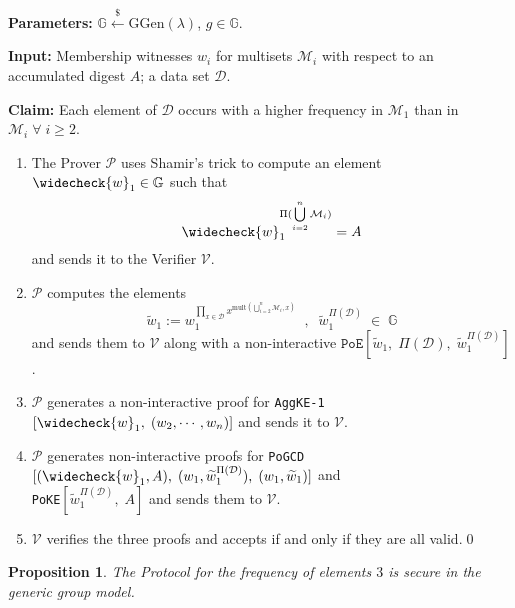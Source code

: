 \documentclass[11pt, lettersize, notitlepage, leqno, footskip=0.6cm]{article}
\newcommand{\pl}{\prod\limits}
\newcommand{\ttt}{\texttt}
\newcommand{\wti}{\widetilde}
\newcommand{\mc}{\mathcal}
\newcommand{\mb}{\mathbb}
\newcommand{\mr}{\mathrm}
\newcommand{\lamb}{\lambda}
\newcommand{\weck}{\widecheck}
\newcommand{\mP}{\mc{P}}
\newcommand{\V}{\mc{V}}
\newcommand{\vs}{\vspace{-0.15cm}}
\newcommand{\noin}{\noindent}
\newtheorem{Prop}[Thm]{Proposition}
\numberwithin{equation}{section}
\begin{document}
\noin \textbf{Parameters:} $\mb{G}\xleftarrow{\$} \mr{GGen}(\lamb)$,\; $g\in \mb{G}$.

\noin \textbf{Input:} Membership witnesses $w_i$ for multisets $\mc{M}_i$ with respect to an accumulated digest $A$; a data set $\mc{D}$.

\noin \textbf{Claim:} Each element of $\mc{D}$ occurs with a higher frequency in $\mc{M}_1$ than in $\mc{M}_i\;\forall\;i\geq 2$. \vs

\begin{enumerate}[wide, labelwidth=!, labelindent=0pt] \vs

\item The Prover $\mP$ uses Shamir's trick to compute an element $\weck{w}_1\in \mb{G}$ such that \vs $$\weck{w}_1 ^{\Pi(\bigcup\limits_{i=2}^n \mc{M}_i)} = A $$ and sends it to the Verifier $\V$. \vs

\item $\mP$ computes the elements \vs $$\wti{w}_1:= w_1^{\pl_{x\in\mc{D}} x^{\mr{mult}(\bigcup\limits_{i=2}^n \mc{M}_i, x)}}\;\;,\;\; \wti{w}_1^{\Pi(\mc{D})}\;\in\;\mb{G}$$ and sends them to $\V$ along with a non-interactive $\ttt{PoE}[\wti{w}_1,\;\Pi(\mc{D}),\;\wti{w}_1^{\Pi(\mc{D})}]$. \vs

\item $\mP$ generates a non-interactive proof for \verb|AggKE-1|$[\weck{w}_1,\;(w_2,\cdots,w_n)]$ and sends it to $\V$. \vs

\item $\mP$ generates non-interactive proofs for \verb|PoGCD|$[(\weck{w}_1, A),\;(w_1,\wti{w}_1^{\Pi(\mc{D})}),\;(w_1,\wti{w}_1)]$ and\\ \verb|PoKE|$[\wti{w}_1^{\Pi(\mc{D})},\;A]$ and sends them to $\V$. \vs

\item $\V$ verifies the three proofs and accepts if and only if they are all valid.\qed\end{enumerate}


\begin{Prop} The Protocol for the frequency of elements $3$ is secure in the generic group model. \end{Prop}
\end{document}
